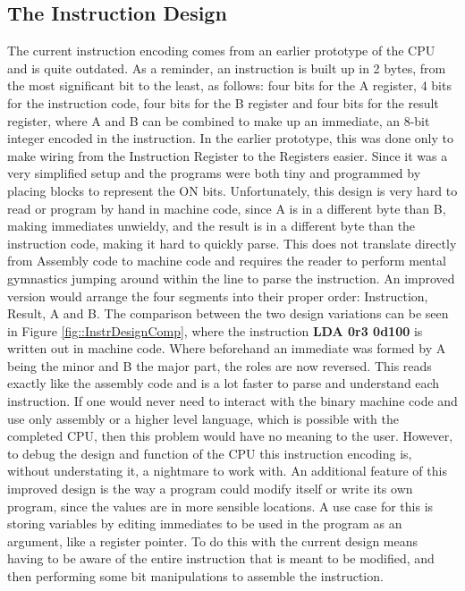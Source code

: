 \subsection{The Instruction Design} \label{ssec::InstructionLayout}
The current instruction encoding comes from an earlier prototype of the CPU and is quite outdated. As a reminder, an instruction is built up in 2 bytes, from the most significant bit to the least, as follows: four bits for the A register, 4 bits for the instruction code, four bits for the B register and four bits for the result register, where A and B can be combined to make up an immediate, an 8-bit integer encoded in the instruction. In the earlier prototype, this was done only to make wiring from the Instruction Register to the Registers easier. Since it was a very simplified setup and the programs were both tiny and programmed by placing blocks to represent the ON bits. Unfortunately, this design is very hard to read or program by hand in machine code, since A is in a different byte than B, making immediates unwieldy, and the result is in a different byte than the instruction code, making it hard to quickly parse. This does not translate directly from Assembly code to machine code and requires the reader to perform mental gymnastics jumping around within the line to parse the instruction. An improved version would arrange the four segments into their proper order: Instruction, Result, A and B. The comparison between the two design variations can be seen in Figure \ref{fig::InstrDesignComp}, where the instruction \textbf{LDA 0r3 0d100} is written out in machine code. Where beforehand an immediate was formed by A being the minor and B the major part, the roles are now reversed. This reads exactly like the assembly code and is a lot faster to parse and understand each instruction. If one would never need to interact with the binary machine code and use only assembly or a higher level language, which is possible with the completed CPU, then this problem would have no meaning to the user. However, to debug the design and function of the CPU this instruction encoding is, without understating it, a nightmare to work with.
An additional feature of this improved design is the way a program could modify itself or write its own program, since the values are in more sensible locations. A use case for this is storing variables by editing immediates to be used in the program as an argument, like a register pointer. To do this with the current design means having to be aware of the entire instruction that is meant to be modified, and then performing some bit manipulations to assemble the instruction.

